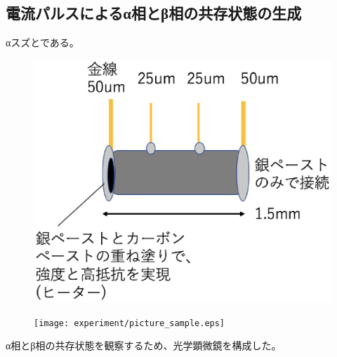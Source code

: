 \subsection{電流パルスによるα相とβ相の共存状態の生成}
αスズとである。
\begin{figure}[!h]
 \begin{minipage}{\hsize}
    \begin{center}
   \includegraphics[width=0.7\hsize]{experiment/schematics_sample.eps}
  \end{center}
  \caption{}
  \label{fig:schematics_sample}
 \end{minipage}
 \begin{minipage}{\hsize}
     \begin{center}
   \texttt{[image: experiment/picture\_sample.eps]}
  \end{center}
  \caption{}
  \label{fig:picture_sample}
   \end{minipage}
\end{figure}


α相とβ相の共存状態を観察するため、光学顕微鏡を構成した。


\clearpage

